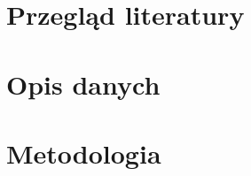 \documentclass[12pt, a4paper]{article}
\begin{document}


\subsection{}


\section{Przegląd literatury}

\section{Opis danych}


\section{Metodologia}
\end{document}
